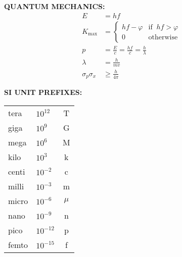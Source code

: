 \documentclass[11pt]{article}
\begin{document}
\begin{multicols*}{3}
  \textbf{QUANTUM MECHANICS:}
  \begin{align*}
    E &= hf\\
    K_\text{max} &=
    \begin{cases}
      hf-\varphi & \text{if}\;\;hf>\varphi\\
    0          & \text{otherwise}
    \end{cases}\\  
    p &= \frac Ec=\frac{hf}c=\frac h\lambda\\
    \lambda &= \frac h{mv}\\
    \sigma_p \sigma_x &\geq\frac h{4\pi}
  \end{align*}

  \textbf{SI UNIT PREFIXES:}
 
  \vspace{.1in}\begin{tabular}{llc}
    tera  & $10^{12}$ & T \\
    giga  & $10^9$  & G \\
    mega  & $10^6$  & M \\
    kilo  & $10^3$  & k \\
    centi & $10^{-2}$ & c \\
    milli & $10^{-3}$ & m \\
    micro & $10^{-6}$ & $\mu$ \\
    nano  & $10^{-9}$ & n\\
    pico  & $10^{-12}$ & p\\
    femto & $10^{-15}$ & f
  \end{tabular}


\end{multicols*}
\end{document}
